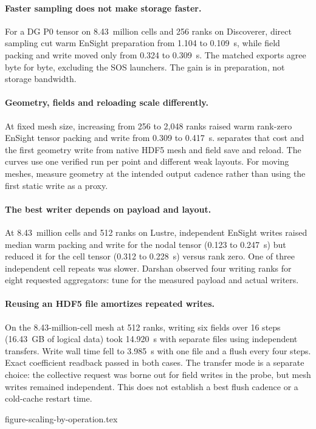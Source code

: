 
\paragraph{Faster sampling does not make storage faster.}
For a DG P0 tensor on 8.43~million cells and 256 ranks on Discoverer,
direct sampling cut warm EnSight preparation from 1.104 to 0.109~s,
while field packing and write moved only from 0.324 to 0.309~s.
The matched exports agree byte for byte, excluding the SOS launchers.
The gain is in preparation, not storage bandwidth.

\paragraph{Geometry, fields and reloading scale differently.}
At fixed mesh size, increasing from 256 to 2,048 ranks raised warm
rank-zero EnSight tensor packing and write from 0.309 to 0.417~s.
 separates that cost
and the first geometry write from native HDF5 mesh and field save
and reload. The curves use one verified run per point and different
weak layouts. For moving meshes, measure geometry at the intended
output cadence rather than using the first static write as a proxy.

\begin{samepage}
\paragraph{The best writer depends on payload and layout.}
At 8.43~million cells and 512 ranks on Lustre, independent EnSight writes
raised median warm packing and write for the nodal tensor (0.123 to
0.247~s) but reduced it for the cell tensor (0.312 to 0.228~s) versus
rank zero. One of three independent cell repeats was slower.
Darshan observed four writing ranks for eight requested aggregators:
tune for the measured payload and actual writers.
\par\end{samepage}
\pagebreak[0]

\begin{samepage}
\paragraph{Reusing an HDF5 file amortizes repeated writes.}
On the 8.43-million-cell mesh at 512 ranks, writing six fields over
16 steps (16.43~GB of logical data) took 14.920~s with separate files
using independent transfers. Write wall time fell
to 3.985~s with one file and a flush every four steps. Exact coefficient
readback passed in both cases. The transfer mode is a separate choice:
the collective request was borne out for field writes in the probe,
but mesh writes remained independent. This does not establish a best
flush cadence or a cold-cache restart time.
\par\end{samepage}

{figure-scaling-by-operation.tex}
